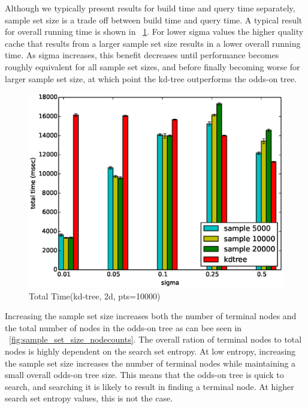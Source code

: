 \documentclass[mcs]{scsthesis}
\begin{document}
Although we typically present results for build time and query time separately,
sample set size is a trade off between build time and query time. A typical
result for overall running time is shown in ~\ref{fig:sample_set_size_total}.
For lower sigma values the higher quality cache that results from a larger
sample set size results in a lower overall running time. As sigma increases,
this benefit decreases until performance becomes roughly equivalent for all
sample set sizes, and before finally becoming worse for larger sample set size,
at which point the kd-tree outperforms the odds-on tree.

\begin{figure}
\begin{center}
\includegraphics[scale=0.5]{diagrams/kt_2d_pts10000_groupbysample_total.eps}
\caption{Total Time(kd-tree, 2d, pts=10000)}
\label{fig:sample_set_size_total}
\end{center}
\end{figure}

Increasing the sample set size increases both the number of terminal nodes and
the total number of nodes in the odds-on tree as can bee seen in
~\ref{fig:sample_set_size_nodecounts}. The overall ration of terminal nodes to
total nodes is highly dependent on the search set entropy. At low entropy,
increasing the sample set size increases the number of terminal nodes while
maintaining a small overall odds-on tree size. This means that the odds-on
tree is quick to search, and searching it is likely to result in finding a
terminal node. At higher search set entropy values, this is not the case.
\end{document}
